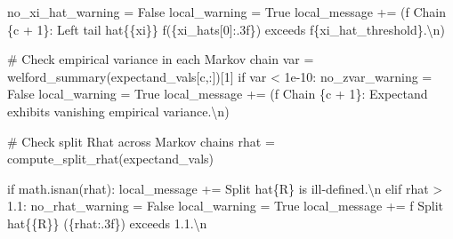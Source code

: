 \documentclass[
  letterpaper,
  DIV=11,
  numbers=noendperiod]{scrartcl}
\newenvironment{Shaded}{\begin{snugshade}}{\end{snugshade}}
\newcommand{\CharTok}[1]{\textcolor[rgb]{0.13,0.47,0.30}{#1}}
\newcommand{\CommentTok}[1]{\textcolor[rgb]{0.37,0.37,0.37}{#1}}
\newcommand{\ControlFlowTok}[1]{\textcolor[rgb]{0.00,0.23,0.31}{#1}}
\newcommand{\DecValTok}[1]{\textcolor[rgb]{0.68,0.00,0.00}{#1}}
\newcommand{\FloatTok}[1]{\textcolor[rgb]{0.68,0.00,0.00}{#1}}
\newcommand{\NormalTok}[1]{\textcolor[rgb]{0.00,0.23,0.31}{#1}}
\newcommand{\OperatorTok}[1]{\textcolor[rgb]{0.37,0.37,0.37}{#1}}
\newcommand{\SpecialCharTok}[1]{\textcolor[rgb]{0.37,0.37,0.37}{#1}}
\newcommand{\SpecialStringTok}[1]{\textcolor[rgb]{0.13,0.47,0.30}{#1}}
\newcommand{\StringTok}[1]{\textcolor[rgb]{0.13,0.47,0.30}{#1}}
\newcommand{\VariableTok}[1]{\textcolor[rgb]{0.07,0.07,0.07}{#1}}
\begin{document}
\begin{Shaded}
\begin{Highlighting}[]
\NormalTok{        no\_xi\_hat\_warning }\OperatorTok{=} \VariableTok{False}
\NormalTok{        local\_warning }\OperatorTok{=} \VariableTok{True}
\NormalTok{        local\_message }\OperatorTok{+=}\NormalTok{ (}\SpecialStringTok{f\textquotesingle{}  Chain }\SpecialCharTok{\{}\NormalTok{c }\OperatorTok{+} \DecValTok{1}\SpecialCharTok{\}}\SpecialStringTok{: Left tail hat}\CharTok{\{\{}\SpecialStringTok{xi}\CharTok{\}\}}\SpecialStringTok{ \textquotesingle{}}
                          \SpecialStringTok{f\textquotesingle{}(}\SpecialCharTok{\{}\NormalTok{xi\_hats[}\DecValTok{0}\NormalTok{]}\SpecialCharTok{:.3f\}}\SpecialStringTok{) exceeds \textquotesingle{}}
                          \SpecialStringTok{f\textquotesingle{}}\SpecialCharTok{\{}\NormalTok{xi\_hat\_threshold}\SpecialCharTok{\}}\SpecialStringTok{.}\CharTok{\textbackslash{}n}\SpecialStringTok{\textquotesingle{}}\NormalTok{)}
      
      \CommentTok{\# Check empirical variance in each Markov chain}
\NormalTok{      var }\OperatorTok{=}\NormalTok{ welford\_summary(expectand\_vals[c,:])[}\DecValTok{1}\NormalTok{]}
      \ControlFlowTok{if}\NormalTok{ var }\OperatorTok{\textless{}} \FloatTok{1e{-}10}\NormalTok{:}
\NormalTok{        no\_zvar\_warning }\OperatorTok{=} \VariableTok{False}
\NormalTok{        local\_warning }\OperatorTok{=} \VariableTok{True}
\NormalTok{        local\_message }\OperatorTok{+=}\NormalTok{ (}\SpecialStringTok{f\textquotesingle{}  Chain }\SpecialCharTok{\{}\NormalTok{c }\OperatorTok{+} \DecValTok{1}\SpecialCharTok{\}}\SpecialStringTok{: Expectand exhibits \textquotesingle{}}
                          \StringTok{\textquotesingle{}vanishing empirical variance.}\CharTok{\textbackslash{}n}\StringTok{\textquotesingle{}}\NormalTok{)}
    
    \CommentTok{\# Check split Rhat across Markov chains}
\NormalTok{    rhat }\OperatorTok{=}\NormalTok{ compute\_split\_rhat(expectand\_vals)}

    \ControlFlowTok{if}\NormalTok{ math.isnan(rhat):}
\NormalTok{      local\_message }\OperatorTok{+=} \StringTok{\textquotesingle{}  Split hat}\SpecialCharTok{\{R\}}\StringTok{ is ill{-}defined.}\CharTok{\textbackslash{}n}\StringTok{\textquotesingle{}}
    \ControlFlowTok{elif}\NormalTok{ rhat }\OperatorTok{\textgreater{}} \FloatTok{1.1}\NormalTok{:}
\NormalTok{      no\_rhat\_warning }\OperatorTok{=} \VariableTok{False}
\NormalTok{      local\_warning }\OperatorTok{=} \VariableTok{True}
\NormalTok{      local\_message }\OperatorTok{+=} \SpecialStringTok{f\textquotesingle{}  Split hat}\CharTok{\{\{}\SpecialStringTok{R}\CharTok{\}\}}\SpecialStringTok{ (}\SpecialCharTok{\{}\NormalTok{rhat}\SpecialCharTok{:.3f\}}\SpecialStringTok{) exceeds 1.1.}\CharTok{\textbackslash{}n}\SpecialStringTok{\textquotesingle{}}


\end{Highlighting}
\end{Shaded}
\end{document}
